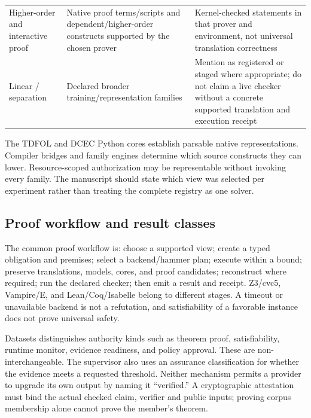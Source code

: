 \documentclass{article}
\begin{document}
\begin{longtable}{@{}>{\raggedright\arraybackslash}p{.24\linewidth} >{\raggedright\arraybackslash}p{.32\linewidth} >{\raggedright\arraybackslash}p{.38\linewidth}@{}}
Higher-order and interactive proof & Native proof terms/scripts and dependent/higher-order constructs supported by the chosen prover & Kernel-checked statements in that prover and environment, not universal translation correctness \\[3pt]
Linear / separation & Declared broader training/representation families & Mention as registered or staged where appropriate; do not claim a live checker without a concrete supported translation and execution receipt \\[3pt]
\end{longtable}
\endgroup


The TDFOL and DCEC Python cores establish parsable native representations. Compiler bridges and family engines determine which source constructs they can lower. Resource-scoped authorization may be representable without invoking every family. The manuscript should state which view was selected per experiment rather than treating the complete registry as one solver.

\subsection{Proof workflow and result classes}

The common proof workflow is: choose a supported view; create a typed obligation and premises; select a backend/hammer plan; execute within a bound; preserve translations, models, cores, and proof candidates; reconstruct where required; run the declared checker; then emit a result and receipt. Z3/cvc5, Vampire/E, and Lean/Coq/Isabelle belong to different stages. A timeout or unavailable backend is not a refutation, and satisfiability of a favorable instance does not prove universal safety.

Datasets distinguishes authority kinds such as theorem proof, satisfiability, runtime monitor, evidence readiness, and policy approval. These are non-interchangeable. The supervisor also uses an assurance classification for whether the evidence meets a requested threshold. Neither mechanism permits a provider to upgrade its own output by naming it ``verified.'' A cryptographic attestation must bind the actual checked claim, verifier and public inputs; proving corpus membership alone cannot prove the member's theorem.
\end{document}
